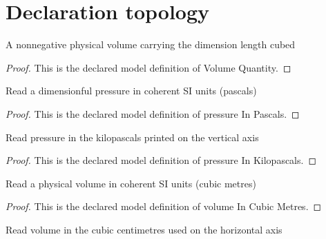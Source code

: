 \section{Declaration topology}
\begin{definition}
  \label{def:physics:phyx-mini-0429:phyxminiproblems-problemphyxmini0429-volumequantity}
  A nonnegative physical volume carrying the dimension length cubed
\end{definition}
\begin{proof}
  This is the declared model definition of Volume Quantity.
\end{proof}
\begin{definition}
  \label{def:physics:phyx-mini-0429:phyxminiproblems-problemphyxmini0429-pressureinpascals}
  Read a dimensionful pressure in coherent SI units (pascals)
\end{definition}
\begin{proof}
  This is the declared model definition of pressure In Pascals.
\end{proof}
\begin{definition}
  \label{def:physics:phyx-mini-0429:phyxminiproblems-problemphyxmini0429-pressureinkilopascals}
  Read pressure in the kilopascals printed on the vertical axis
\end{definition}
\begin{proof}
  This is the declared model definition of pressure In Kilopascals.
\end{proof}
\begin{definition}
  \label{def:physics:phyx-mini-0429:phyxminiproblems-problemphyxmini0429-volumeincubicmetres}
  Read a physical volume in coherent SI units (cubic metres)
\end{definition}
\begin{proof}
  This is the declared model definition of volume In Cubic Metres.
\end{proof}
\begin{definition}
  \label{def:physics:phyx-mini-0429:phyxminiproblems-problemphyxmini0429-volumeincubiccentimetres}
  Read volume in the cubic centimetres used on the horizontal axis
\end{definition}
